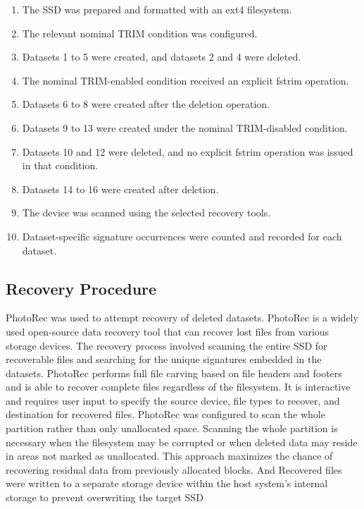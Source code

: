 \begin{enumerate}
\item The SSD was prepared and formatted with an ext4 filesystem.

\item The relevant nominal TRIM condition was configured.

\item Datasets 1 to 5 were created, and datasets 2 and 4 were deleted.

\item The nominal TRIM-enabled condition received an explicit fstrim operation.

\item Datasets 6 to 8 were created after the deletion operation.

\item Datasets 9 to 13 were created under the nominal TRIM-disabled condition.

\item Datasets 10 and 12 were deleted, and no explicit fstrim operation was issued in that condition.

\item Datasets 14 to 16 were created after deletion.

\item The device was scanned using the selected recovery tools.

\item Dataset-specific signature occurrences were counted and recorded for each dataset.

\end{enumerate}
\subsection*{Recovery Procedure}

PhotoRec was used to attempt recovery of deleted datasets. PhotoRec is a widely used open-source data recovery tool that can recover lost files from various storage 
devices. The recovery process involved scanning the entire SSD for recoverable files and searching for the unique signatures embedded in the datasets. 
PhotoRec performs full file carving based on file headers and footers and is able to recover complete files regardless of the filesystem. It is interactive and 
requires user input to specify the source device, file types to recover, and destination for recovered files. PhotoRec was configured to scan the whole partition rather 
than only unallocated space. Scanning the whole partition is necessary when the filesystem may be corrupted or when deleted data may reside in areas not marked as 
unallocated. This approach maximizes the chance of recovering residual data from previously allocated blocks. And Recovered files were written to a separate storage 
device within the host system's internal storage to prevent overwriting the target SSD

